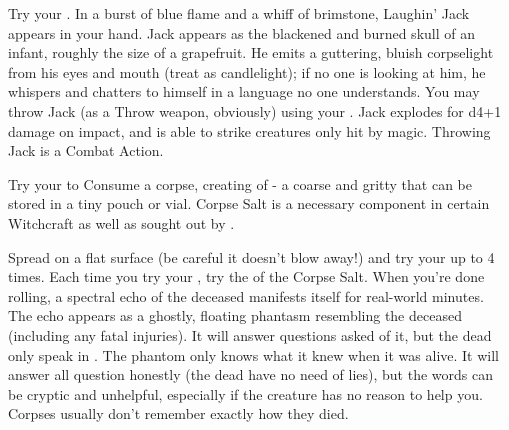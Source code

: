 

\NECRO[
  Name=Laughin' Jack,
  Link=witchcraft-laughin-jack
]

Try your \JUJU. In a burst of blue flame and a whiff of brimstone, Laughin' Jack appears in your hand.  Jack appears as the blackened and burned skull of an infant, roughly the size of a grapefruit.  He emits a guttering, bluish corpselight from his eyes and mouth (treat as candlelight); if no one is looking at him, he whispers and chatters to himself in a language no one understands.  You may throw Jack (as a Throw weapon, obviously) using your \FOC.  Jack explodes for d4+1 damage on impact, and is able to strike creatures only hit by magic.  Throwing Jack is a Combat Action.




\NECRO[
  Name=Corpse Salt,
  Link=witchcraft-corpse-salt
]

Try your \JUJU to Consume a corpse, creating  of  - a coarse and gritty  that can be stored in a tiny pouch or vial.  Corpse Salt is a necessary component in certain Witchcraft as well as sought out by .


\NECRO[
  Name=Corpse Tongue,
  Link=witchcraft-corpse-tongue
]

Spread  on a flat surface (be careful it doesn't blow away!) and try your \JUJU up to 4 times. Each time you try your \JUJU, try the \UD of the Corpse Salt. When you're done rolling, a spectral echo of the deceased manifests itself for \SUMDICE real-world minutes. The echo appears as a ghostly, floating phantasm resembling the deceased (including any fatal injuries). It will answer questions asked of it, but the dead only speak in . The phantom only knows what it knew when it was alive. It will answer all question honestly (the dead have no need of lies), but the words can be cryptic and unhelpful, especially if the creature has no reason to help you.  Corpses usually don't remember exactly how they died.

